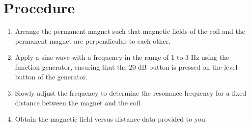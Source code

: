 \section{Procedure}

\begin{enumerate}
    \item Arrange the permanent magnet such that magnetic fields of the coil and the permanent magnet are perpendicular to each other.
    \item Apply a sine wave with a frequency in the range of 1 to 3 Hz using the function generator, ensuring that the 20 dB button is pressed on the level button of the generator.
    \item Slowly adjust the frequency to determine the resonance frequency for a fixed distance between the magnet and the coil.
    \item Obtain the magnetic field versus distance data provided to you.
\end{enumerate}